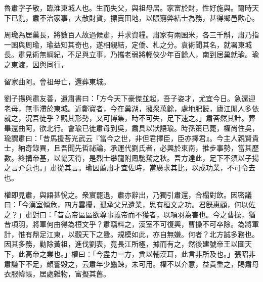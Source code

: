 \begin{pinyinscope}
 
 
 魯肅字子敬，臨淮東城人也。生而失父，與祖母居。家富於財，性好施與。爾時天下已亂，肅不治家事，大散財貨，摽賣田地，以賑窮弊結士為務，甚得鄉邑歡心。
 
 
 
 
 周瑜為居巢長，將數百人故過候肅，并求資糧。肅家有兩囷米，各三千斛，肅乃指一囷與周瑜，瑜益知其奇也，遂相親結，定僑、札之分。袁術聞其名，就署東城長。肅見術無綱紀，不足與立事，乃攜老弱將輕俠少年百餘人，南到居巢就瑜。瑜之東渡，因與同行，
 
 
 留家曲阿。會祖母亡，還葬東城。
 
 
 
 
 劉子揚與肅友善，遺肅書曰：「方今天下豪傑並起，吾子姿才，尤宜今日。急還迎老母，無事滯於東城。近鄭寶者，今在巢湖，擁衆萬餘，處地肥饒，廬江閒人多依就之，況吾徒乎？觀其形勢，又可博集，時不可失，足下速之。」肅荅然其計。葬畢還曲阿，欲北行。會瑜已徙肅母到吳，肅具以狀語瑜。時孫策已薨，權尚住吳，瑜謂肅曰：「昔馬援荅光武云『當今之世，非但君擇臣，臣亦擇君』。今主人親賢貴士，納奇錄異，且吾聞先哲祕論，承運代劉氏者，必興於東南，推步事勢，當其歷數。終搆帝基，以協天符，是烈士攀龍附鳳馳騖之秋。吾方達此，足下不須以子揚之言介意也。」肅從其言。瑜因薦肅才宜佐時，當廣求其比，以成功業，不可令去也。
 
 
 
 
 權即見肅，與語甚恱之。衆賔罷退，肅亦辭出，乃獨引肅還，合榻對飲。因密議曰：「今漢室傾危，四方雲擾，孤承父兄遺業，思有桓文之功。君旣惠顧，何以佐之？」肅對曰：「昔高帝區區欲尊事義帝而不獲者，以項羽為害也。今之曹操，猶昔項羽，將軍何由得為桓文乎？肅竊料之，漢室不可復興，曹操不可卒除。為將軍計，惟有鼎足江東，以觀天下之釁。規模如此，亦自無嫌。何者？北方誠多務也。因其多務，勦除黃祖，進伐劉表，竟長江所極，據而有之，然後建號帝王以圖天下，此高帝之業也。」權曰：「今盡力一方，兾以輔漢耳，此言非所及也。」張昭非肅謙下不足，頗訾毀之，云肅年少麤踈，未可用。權不以介意，益貴重之，賜肅母衣服幃帳，居處雜物，富擬其舊。
 

\end{pinyinscope}
